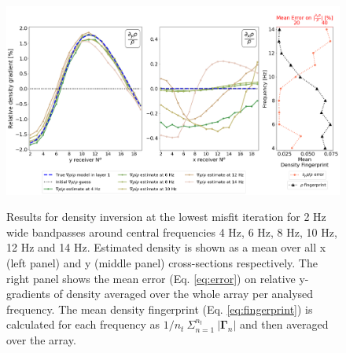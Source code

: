 \documentclass{article}
\begin{document}
	
	\begin{figure}[H] 
		\vspace{-0.5cm}
		\centering
		{\includegraphics[width =\textwidth, keepaspectratio]{../Figures/freq_study_RHOgrad_REL.png}}
		\caption{Results for density inversion at the lowest misfit iteration for 2 Hz wide bandpasses around central frequencies 4 Hz, 6 Hz, 8 Hz, 10 Hz, 12 Hz and 14 Hz. Estimated density is shown as a mean over all x (left panel) and y (middle panel) cross-sections respectively. The right panel shows the mean error (Eq. \ref{eq:error}) on relative y-gradients of density averaged over the whole array per analysed frequency. The mean density fingerprint (Eq. \ref{eq:fingerprint}) is calculated for each frequency as $ 1/n_{t} \: \Sigma_{n=1}^{n_{t}} \: |\bm{\Gamma}_{n}|$ and then averaged over the array.}\label{fig:freq_rho}
	\end{figure}
	
\end{document}
